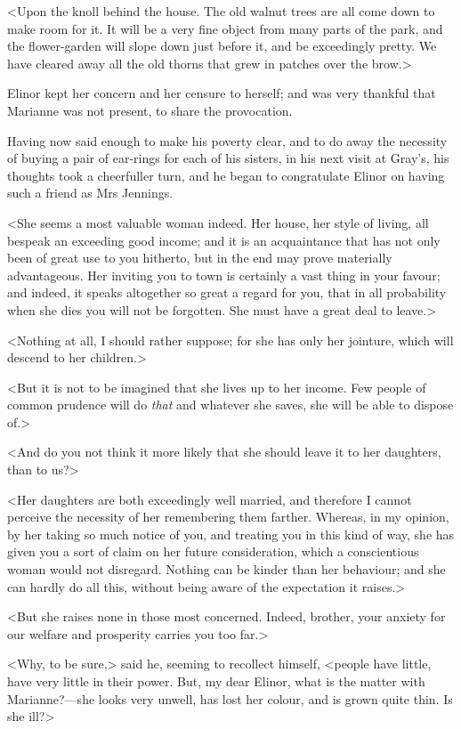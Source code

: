 <Upon the knoll behind the house. The old walnut trees are all come down to make room for it. It will be a very fine object from many parts of the park, and the flower-garden will slope down just before it, and be exceedingly pretty. We have cleared away all the old thorns that grew in patches over the brow.>

Elinor kept her concern and her censure to herself; and was very thankful that Marianne was not present, to share the provocation.

Having now said enough to make his poverty clear, and to do away the necessity of buying a pair of ear-rings for each of his sisters, in his next visit at Gray's, his thoughts took a cheerfuller turn, and he began to congratulate Elinor on having such a friend as Mrs Jennings.

<She seems a most valuable woman indeed. Her house, her style of living, all bespeak an exceeding good income; and it is an acquaintance that has not only been of great use to you hitherto, but in the end may prove materially advantageous. Her inviting you to town is certainly a vast thing in your favour; and indeed, it speaks altogether so great a regard for you, that in all probability when she dies you will not be forgotten. She must have a great deal to leave.>

<Nothing at all, I should rather suppose; for she has only her jointure, which will descend to her children.>

<But it is not to be imagined that she lives up to her income. Few people of common prudence will do \textit{that} and whatever she saves, she will be able to dispose of.>

<And do you not think it more likely that she should leave it to her daughters, than to us?>

<Her daughters are both exceedingly well married, and therefore I cannot perceive the necessity of her remembering them farther. Whereas, in my opinion, by her taking so much notice of you, and treating you in this kind of way, she has given you a sort of claim on her future consideration, which a conscientious woman would not disregard. Nothing can be kinder than her behaviour; and she can hardly do all this, without being aware of the expectation it raises.>

<But she raises none in those most concerned. Indeed, brother, your anxiety for our welfare and prosperity carries you too far.>

<Why, to be sure,> said he, seeming to recollect himself, <people have little, have very little in their power. But, my dear Elinor, what is the matter with Marianne?—she looks very unwell, has lost her colour, and is grown quite thin. Is she ill?>

